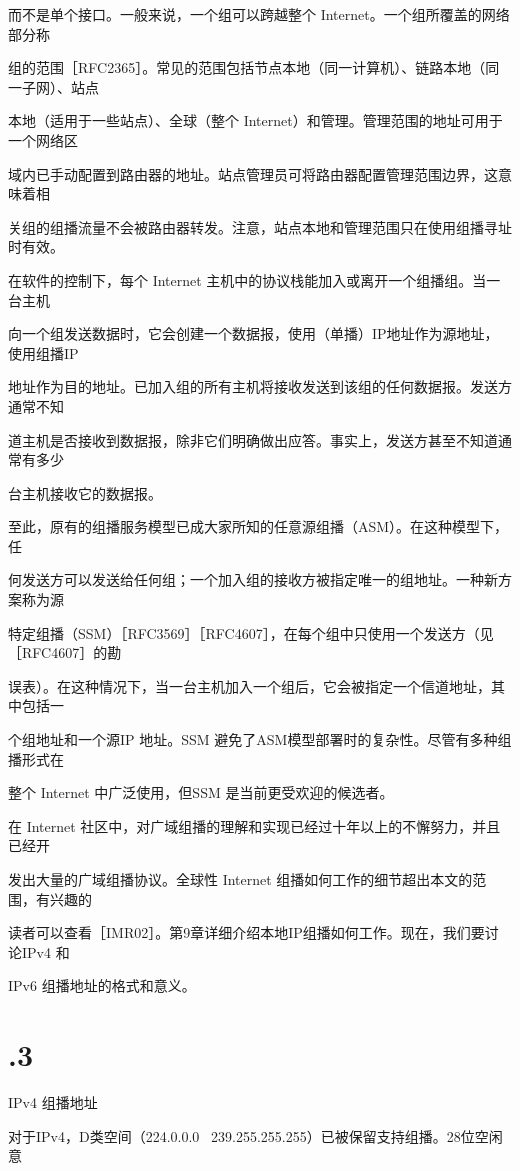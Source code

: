 而不是单个接口。一般来说，一个组可以跨越整个 Internet。一个组所覆盖的网络部分称

组的范围［RFC2365］。常见的范围包括节点本地（同一计算机）、链路本地（同一子网）、站点

本地（适用于一些站点）、全球（整个 Internet）和管理。管理范围的地址可用于一个网络区

域内已手动配置到路由器的地址。站点管理员可将路由器配置管理范围边界，这意味着相

关组的组播流量不会被路由器转发。注意，站点本地和管理范围只在使用组播寻址时有效。

在软件的控制下，每个 Internet 主机中的协议栈能加入或离开一个组播组。当一台主机

向一个组发送数据时，它会创建一个数据报，使用（单播）IP地址作为源地址，使用组播IP

地址作为目的地址。已加入组的所有主机将接收发送到该组的任何数据报。发送方通常不知

道主机是否接收到数据报，除非它们明确做出应答。事实上，发送方甚至不知道通常有多少

台主机接收它的数据报。

至此，原有的组播服务模型已成大家所知的任意源组播（ASM）。在这种模型下，任

何发送方可以发送给任何组；一个加入组的接收方被指定唯一的组地址。一种新方案称为源

特定组播（SSM）［RFC3569］［RFC4607］，在每个组中只使用一个发送方（见［RFC4607］的勘

误表）。在这种情况下，当一台主机加入一个组后，它会被指定一个信道地址，其中包括一

个组地址和一个源IP 地址。SSM 避免了ASM模型部署时的复杂性。尽管有多种组播形式在

整个 Internet 中广泛使用，但SSM 是当前更受欢迎的候选者。

在 Internet 社区中，对广域组播的理解和实现已经过十年以上的不懈努力，并且已经开

发出大量的广域组播协议。全球性 Internet 组播如何工作的细节超出本文的范围，有兴趣的

读者可以查看［IMR02］。第9章详细介绍本地IP组播如何工作。现在，我们要讨论IPv4 和

IPv6 组播地址的格式和意义。

\section{.3}
IPv4 组播地址

对于IPv4，D类空间（224.0.0.0 ~239.255.255.255）已被保留支持组播。28位空闲意

